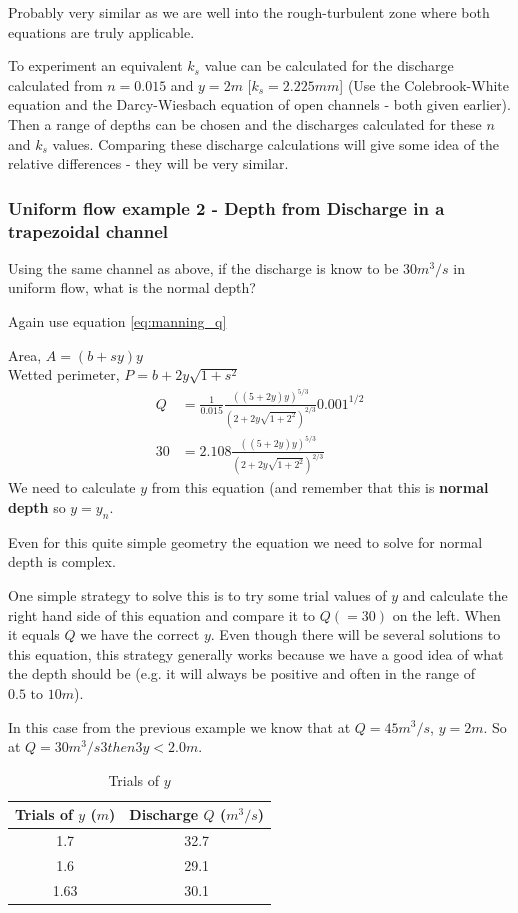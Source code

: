 \documentclass[a4paper, 12pt, british]{article} %
\numberwithin{equation}{section}
\numberwithin{figure}{section}
\numberwithin{table}{section}
\begin{document}
Probably very similar as we are well into the rough-turbulent zone where both equations are truly applicable.

To experiment an equivalent $k_s$ value can be calculated for the discharge calculated from $n = 0.015$  and $y = 2m$ [$k_s = 2.225mm$] (Use the Colebrook-White equation and the Darcy-Wiesbach equation of open channels - both given earlier). Then a range of depths can be chosen and the discharges calculated for these $n$ and $k_s$ values. Comparing these discharge calculations will give some idea of the relative differences - they will be very similar.


\subsubsection{Uniform flow example 2 - Depth from Discharge in a trapezoidal channel}

Using the same channel as above, if the discharge is know to be $30m^3/s$ in uniform flow, what is the normal depth?

Again use equation \ref{eq:manning_q} 

Area, $A =(b+sy)y$  \\
Wetted perimeter, $P =b+2y\sqrt{1+s^2}$
\begin{align*}
Q &= \frac{1}{0.015}\frac{((5+2y)y)^{5/3}}{\left(2+2y\sqrt{1+2^2}\right)^{2/3}}0.001^{1/2}\\
30 &= 2.108\frac{((5+2y)y)^{5/3}}{\left(2+2y\sqrt{1+2^2}\right)^{2/3}}
\end{align*}
We need to calculate $y$ from this equation (and remember that this is \textbf{normal depth} so $y = y_n$. 

Even for this quite simple geometry the equation we need to solve for normal depth is complex. 

One simple strategy to solve this is to try some trial values of $y$ and calculate the right hand side of this equation and compare it to $Q (=30)$ on the left. When it equals $Q$ we have the correct $y$. Even though there will be several solutions to this equation, this strategy generally works because we have a good idea of what the depth should be (e.g. it will always be positive and often in the range of $0.5 \text{ to } 10 m$). 

In this case from the previous example we know that at $Q = 45 m^3/s$, $y = 2m$. So at $Q = 30 m^3/s3 then 3y < 2.0m$.

\begin{table}[H]
	\centering
	\begin{tabular}{cc}
		\hline
		Trials of $y$ ($m$) &Discharge $Q$ ($m^3/s$) \\
		\hline
		1.7	&32.7\\
		1.6	&29.1\\
		1.63&	30.1\\
		\hline
	\end{tabular}
	\caption{Trials of $y$}
	\label{tab:ex21}
\end{table}
\end{document}
